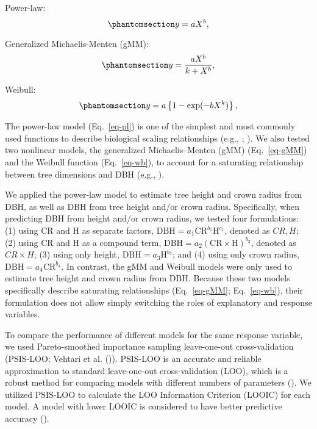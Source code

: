 \documentclass[
  12pt,
  letterpaper,
  DIV=11,
  numbers=noendperiod]{scrartcl}
\begin{document}
Power-law: \begin{equation}\phantomsection\label{eq-pl}{
y = aX^b,
}\end{equation}

Generalized Michaelis-Menten (gMM):
\begin{equation}\phantomsection\label{eq-gMM}{
y = \frac{aX^b}{k + X^b},
}\end{equation}

Weibull: \begin{equation}\phantomsection\label{eq-wb}{
y = a\left\{1-\mathrm{exp}(-bX^k)\right\},
}\end{equation}

The power-law model (Eq.~\ref{eq-pl}) is one of the simplest and most
commonly used functions to describe biological scaling relationships
(e.g., ;
). We also tested two
nonlinear models, the generalized Michaelis--Menten (gMM)
(Eq.~\ref{eq-gMM}) and the Weibull function (Eq.~\ref{eq-wb}), to
account for a saturating relationship between tree dimensions and DBH
(e.g., ).

We applied the power-law model to estimate tree height and crown radius
from DBH, as well as DBH from tree height and/or crown radius.
Specifically, when predicting DBH from height and/or crown radius, we
tested four formulations: (1) using CR and H as separate factors,
\(\mathrm{DBH} = a_1 \mathrm{CR}^{b_1} \mathrm{H}^{c_1}\), denoted as
\(CR,H\); (2) using CR and H as a compound term,
\(\mathrm{DBH} = a_2 (\mathrm{CR} \times \mathrm{H})^{b_2}\), denoted as
\(CR \times H\); (3) using only height,
\(\mathrm{DBH} = a_3 \mathrm{H}^{b_3}\); and (4) using only crown
radius, \(\mathrm{DBH} = a_4 \mathrm{CR}^{b_4}\). In contrast, the gMM
and Weibull models were only used to estimate tree height and crown
radius from DBH. Because these two models specifically describe
saturating relationships (Eq.~\ref{eq-gMM}; Eq.~\ref{eq-wb}), their
formulation does not allow simply switching the roles of explanatory and
response variables.

To compare the performance of different models for the same response
variable, we used Pareto-smoothed importance sampling leave-one-out
cross-validation (PSIS-LOO; Vehtari et al.
()). PSIS-LOO is an accurate and
reliable approximation to standard leave-one-out cross-validation (LOO),
which is a robust method for comparing models with different numbers of
parameters (). We
utilized PSIS-LOO to calculate the LOO Information Criterion (LOOIC) for
each model. A model with lower LOOIC is considered to have better
predictive accuracy ().
\end{document}
